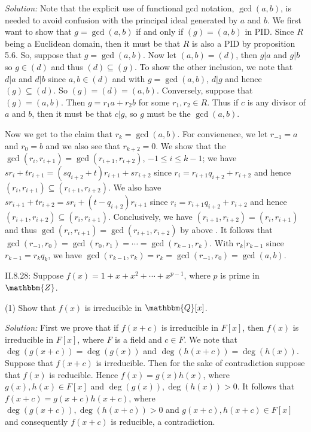 \documentclass{letter}
\newcommand{\tmem}[1]{{\em #1\/}}
\begin{document}
{\tmem{Solution:}} Note that the explicit use of functional gcd notation,
$\gcd (a, b)$, is needed to avoid confusion with the principal ideal generated
by $a$ and $b$. We first want to show that $g = \gcd (a, b)$ if and only if
$(g) = (a, b)$ in PID. Since $R$ being a Euclidean domain, then it must be
that $R$ is also a PID by proposition 5.6. So, suppose that $g = \gcd (a, b)$.
Now let $(a, b) = (d)$, then $g | a$ and $g| b$ so $g \in (d)$ and thus $(d)
\subseteq (g)$. To show the other inclusion, we note that $d | a$ and $d | b$
since $a, b \in (d)$ and with $g = \gcd (a, b)$, $d | g$ and hence $(g)
\subseteq (d)$. So $(g) = (d) = (a, b)$. Conversely, suppose that $(g) = (a,
b)$. Then $g = r_1 a + r_2 b$ for some $r_1, r_2 \in R$. Thus if $c$ is any
divisor of $a$ and $b$, then it must be that $c | g$, so $g$ must be the $\gcd
(a, b)$.

Now we get to the claim that $r_k = \gcd (a, b)$. For convienence, we let
$r_{- 1} = a$ and $r_0 = b$ and we also see that $r_{k + 2} = 0$. We show that
the $\gcd (r_i, r_{i + 1}) = \gcd (r_{i + 1}, r_{i + 2})$, $- 1 \leq i \leq k
- 1$; we have $s r_i + t r_{i + 1} = (s q_{i + 2} + t) r_{i + 1} + s r_{i +
2}$ since $r_i = r_{i + 1} q_{i + 2} + r_{i + 2}$ and hence $(r_i, r_{i + 1})
\subseteq (r_{i + 1}, r_{i + 2})$. We also have $s r_{i + 1} + t r_{i + 2} = s
r_i + (t - q_{i + 2}) r_{i + 1}$ since $r_i = r_{i + 1} q_{i + 2} + r_{i + 2}$
and hence $(r_{i + 1}, r_{i + 2}) \subseteq (r_i, r_{i + 1})$. Conclusively,
we have $(r_{i + 1}, r_{i + 2}) = (r_i, r_{i + 1})$ and thus $\gcd (r_i, r_{i
+ 1}) = \gcd (r_{i + 1}, r_{i + 2})$ by above . It follows that $\gcd (r_{-
1}, r_0) = \gcd (r_0, r_1) = \cdots = \gcd (r_{k - 1}, r_k)$. With $r_k | r_{k
- 1}$ since $r_{k - 1} = r_k q_k$, we have $\gcd (r_{k - 1}, r_k) = r_k = \gcd
(r_{- 1}, r_0) = \gcd (a, b)$.

II.8.28: Suppose $f (x) = 1 + x + x^2 + \cdots + x^{p - 1}$, where $p$ is
prime in $\mathbbm{Z}$.

(1) Show that $f (x)$ is irreducible in $\mathbbm{Q}[x]$.

{\tmem{Solution:}} First we prove that if $f (x + c)$ is irreducible in $F
[x]$, then $f (x)$ is irreducible in $F [x]$, where $F$ is a field and $c \in
F$. We note that $\deg (g (x + c)) = \deg (g (x))$ and $\deg (h (x + c)) =
\deg (h (x))$. Suppose that $f (x + c)$ is irreducible. Then for the sake of
contradiction suppose that $f (x)$ is reducible. Hence $f (x) = g (x) h (x)$,
where $g (x), h (x) \in F [x]$ and $\deg (g (x)), \deg (h (x)) > 0$. It
follows that $f (x + c) = g (x + c) h (x + c)$, where $\deg (g (x + c)), \deg
(h (x + c)) > 0$ and $g (x + c), h (x + c) \in F [x]$ and consequently $f (x +
c)$ is reducible, a contradiction.
\end{document}
